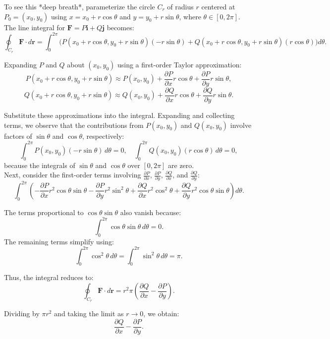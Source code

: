 \noindent To see this *deep breath*, parameterize the circle $C_r$ of radius $r$ centered at $P_0 = (x_0, y_0)$ using $x = x_0 + r \cos\theta$ and $y = y_0 + r \sin\theta$, where $\theta \in [0, 2\pi]$. The line integral for $\mathbf{F} = P\mathbf{i} + Q\mathbf{j}$ becomes:
\[
\oint_{C_r} \mathbf{F} \cdot d\mathbf{r} = \int_0^{2\pi} \big(P(x_0 + r \cos\theta, y_0 + r \sin\theta)(-r \sin\theta) + Q(x_0 + r \cos\theta, y_0 + r \sin\theta)(r \cos\theta)\big) d\theta.
\]

\noindent Expanding $P$ and $Q$ about $(x_0, y_0)$ using a first-order Taylor approximation:
\[
P(x_0 + r \cos\theta, y_0 + r \sin\theta) \approx P(x_0, y_0) + \frac{\partial P}{\partial x} r \cos\theta + \frac{\partial P}{\partial y} r \sin\theta,
\]
\[
Q(x_0 + r \cos\theta, y_0 + r \sin\theta) \approx Q(x_0, y_0) + \frac{\partial Q}{\partial x} r \cos\theta + \frac{\partial Q}{\partial y} r \sin\theta.
\]

\noindent Substitute these approximations into the integral. Expanding and collecting terms, we observe that the contributions from $P(x_0, y_0)$ and $Q(x_0, y_0)$ involve factors of $\sin\theta$ and $\cos\theta$, respectively:
\[
\int_0^{2\pi} P(x_0, y_0)(-r \sin\theta) \, d\theta = 0, \quad \int_0^{2\pi} Q(x_0, y_0)(r \cos\theta) \, d\theta = 0,
\]
because the integrals of $\sin\theta$ and $\cos\theta$ over $[0, 2\pi]$ are zero. \\

\noindent Next, consider the first-order terms involving $\frac{\partial P}{\partial x}$, $\frac{\partial P}{\partial y}$, $\frac{\partial Q}{\partial x}$, and $\frac{\partial Q}{\partial y}$:
\[
\int_0^{2\pi} \left(-\frac{\partial P}{\partial x} r^2 \cos\theta \sin\theta - \frac{\partial P}{\partial y} r^2 \sin^2\theta + \frac{\partial Q}{\partial x} r^2 \cos^2\theta + \frac{\partial Q}{\partial y} r^2 \cos\theta \sin\theta\right) d\theta.
\]

\noindent The terms proportional to $\cos\theta \sin\theta$ also vanish because:
\[
\int_0^{2\pi} \cos\theta \sin\theta \, d\theta = 0.
\]
\noindent The remaining terms simplify using:
\[
\int_0^{2\pi} \cos^2\theta \, d\theta = \int_0^{2\pi} \sin^2\theta \, d\theta = \pi.
\]

\noindent Thus, the integral reduces to:
\[
\oint_{C_r} \mathbf{F} \cdot d\mathbf{r} = r^2 \pi \left(\frac{\partial Q}{\partial x} - \frac{\partial P}{\partial y}\right).
\]


\noindent Dividing by $\pi r^2$ and taking the limit as $r \to 0$, we obtain:
\[
\frac{\partial Q}{\partial x} - \frac{\partial P}{\partial y}.
\]

